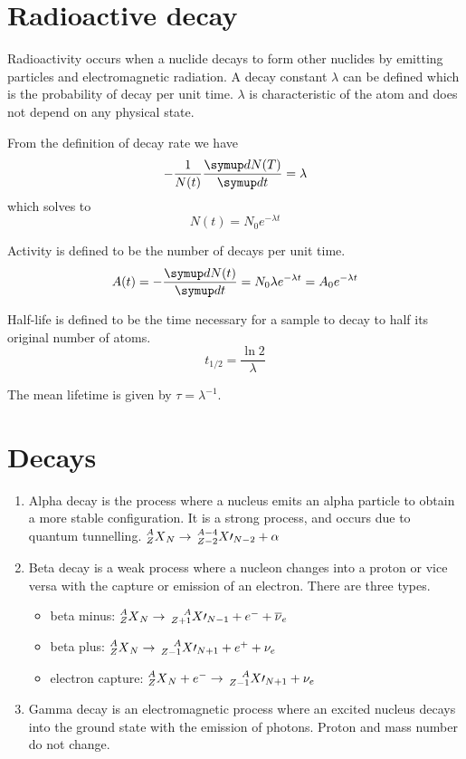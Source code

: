 \section{Radioactive decay}
Radioactivity occurs when a nuclide decays to form other nuclides by emitting particles and electromagnetic radiation. A decay constant \(\lambda\) can be defined which is the probability of decay per unit time. \(\lambda\) is characteristic of the atom and does not depend on any physical state.

From the definition of decay rate we have \[-\frac{1}{N(t)}\frac{\sld{N(T)}}{\sld{t}} = \lambda\] which solves to \[N(t) = N_0e^{-\lambda t}\]

Activity is defined to be the number of decays per unit time. \[A(t) = -\frac{\sld{N(t)}}{\sld{t}} = N_0\lambda e^{-\lambda t} = A_0e^{-\lambda t}\]

Half-life is defined to be the time necessary for a sample to decay to half its original number of atoms. \[t_{1/2} = \frac{\ln2}{\lambda}\]

The mean lifetime is given by \(\tau = \lambda^{-1}\).
\section{Decays}
\begin{enumerate}
\item Alpha decay is the process where a nucleus emits an alpha particle to obtain a more stable configuration. It is a strong process, and occurs due to quantum tunnelling. \(\prescript{A}{Z}{X}_N \mathrel\rightarrow{} \prescript{A-4}{Z-2}{X\prime}_{N-2} + \alpha\)
\item Beta decay is a weak process where a nucleon changes into a proton or vice versa with the capture or emission of an electron. There are three types.
\begin{itemize}
    \item beta minus: \(\prescript{A}{Z}{X}_N \mathrel\rightarrow{} \prescript{A}{Z+1}{X\prime}_{N-1} + e^- + \overline{\nu}_e\)
    \item beta plus: \(\prescript{A}{Z}{X}_N \mathrel\rightarrow{} \prescript{A}{Z-1}{X\prime}_{N+1} + e^+ + \nu_e\)
    \item electron capture: \(\prescript{A}{Z}{X}_N + e^- \mathrel\rightarrow{} \prescript{A}{Z-1}{X\prime}_{N+1} + \nu_e\)
\end{itemize}
\item Gamma decay is an electromagnetic process where an excited nucleus decays into the ground state with the emission of photons. Proton and mass number do not change.
\end{enumerate}